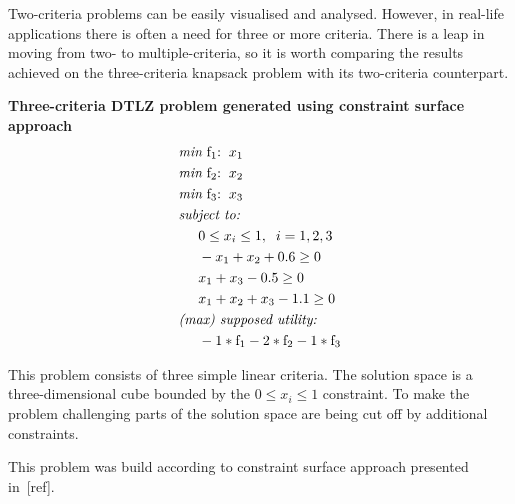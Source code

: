 \begin{description}
    Two-criteria problems can be easily visualised and analysed. However, in
    real-life applications there is often a need for three or more
    criteria. There is a leap in moving from two- to multiple-criteria, so it
    is worth comparing the results achieved on the three-criteria knapsack
    problem with its two-criteria counterpart.

  \item{\textbf{Three-criteria DTLZ problem generated using constraint surface
    approach}}
    \begin{align*}
      & \textit{min}\text{ f$_1$:} \hspace{0.2cm} x_1 \\
      & \textit{min}\text{ f$_2$:} \hspace{0.2cm} x_2 \\
      & \textit{min}\text{ f$_3$:} \hspace{0.2cm} x_3 \\
      & \textit{subject to:} \\
      & \hspace{0.5cm} 0 \le x_i \le 1, \hspace{0.2cm} i = 1, 2, 3 \\
      & \hspace{0.5cm} -x_1 + x_2 + 0.6 \ge 0 \\
      & \hspace{0.5cm} x_1 + x_3 - 0.5 \ge 0 \\
      & \hspace{0.5cm} x_1 + x_2 + x_3 - 1.1 \ge 0 \\
      & \textit{(max) supposed utility:} \\
      & \hspace{0.5cm} -1 * \text{f}_1 - 2 * \text{f}_2 - 1 * \text{f}_3
    \end{align*}

    This problem consists of three simple linear criteria. The solution space
    is a three-dimensional cube bounded by the $0 \le x_i \le 1$ constraint. To
    make the problem challenging parts of the solution space are being cut off
    by additional constraints.

    This problem was build according to constraint surface approach presented
    in~[ref].


\end{description}
